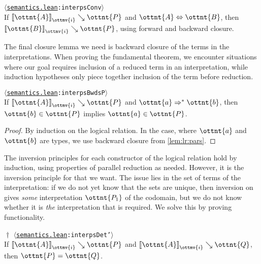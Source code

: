 \documentclass[a4paper,UKenglish,cleveref,autoref,thm-restate]{lipics-v2021}
\newcommand{\repo}{https://github.com/ionathanch/TTBFL}
\newcommand{\thmref}[2]{%
  $\langle$\href{\repo/tree/main/src/#1}{\texttt{#1}}\texttt{:#2}$\rangle$%
}
\begin{document}
\begin{corollary}[Conversion (l.r.)] \thmref{semantics.lean}{interpsConv} \\
  If $ \mathopen{\llbracket}  \ottnt{A}  \mathclose{\rrbracket}_{ \ottmv{i} } \searrow  \ottnt{P} $ and $ \ottnt{A}  \Leftrightarrow  \ottnt{B} $,
  then $ \mathopen{\llbracket}  \ottnt{B}  \mathclose{\rrbracket}_{ \ottmv{i} } \searrow  \ottnt{P} $,
  using forward and backward closure.
\end{corollary}

The final closure lemma we need is backward closure of the terms in the interpretations.
When proving the fundamental theorem,
we encounter situations where our goal requires inclusion of a reduced term in an interpretation,
while induction hypotheses only piece together inclusion of the term before reduction.

\begin{lemma} \thmref{semantics.lean}{interpsBwdsP} \label{lem:lr:back} \\
  If $ \mathopen{\llbracket}  \ottnt{A}  \mathclose{\rrbracket}_{ \ottmv{i} } \searrow  \ottnt{P} $ and $ \ottnt{a}  \Rightarrow^\ast  \ottnt{b} $,
  then $ \ottnt{b}  \in  \ottnt{P} $ implies $ \ottnt{a}  \in  \ottnt{P} $.
\end{lemma}

\begin{proof}
  By induction on the logical relation.
  In the  case, where $\ottnt{a}$ and $\ottnt{b}$ are types,
  we use backward closure from \cref{lem:lr:pars}.
\end{proof}

The inversion principles for each constructor of the logical relation
hold by induction, using properties of parallel reduction as needed.
However, it is the inversion principle for  that we want.
The issue lies in the set of terms of the interpretation:
if we do not yet know that the sets are unique,
then inversion on  gives \emph{some} interpretation $\ottnt{P_{{\mathrm{1}}}}$ of the codomain,
but we do not know whether it is \emph{the} interpretation that is required.
We solve this by proving functionality.

\begin{lemma}$\!\!{\dagger}$ \thmref{semantics.lean}{interpsDet'} \label{lem:lr:fixed-func} \\
  If $ \mathopen{\llbracket}  \ottnt{A}  \mathclose{\rrbracket}_{ \ottmv{i} } \searrow  \ottnt{P} $ and $ \mathopen{\llbracket}  \ottnt{A}  \mathclose{\rrbracket}_{ \ottmv{i} } \searrow  \ottnt{Q} $, then $\ottnt{P} = \ottnt{Q}$.
\end{lemma}
\end{document}
